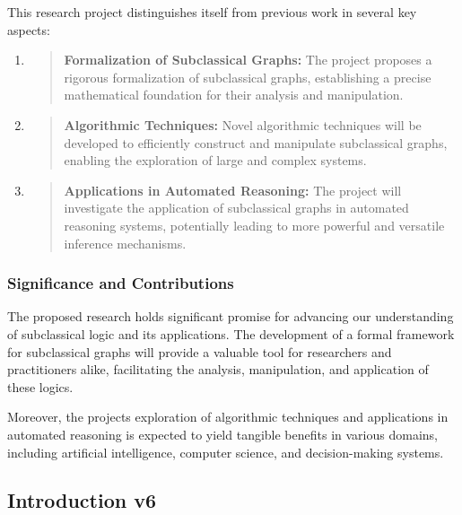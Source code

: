 This research project distinguishes itself from previous work in several
key aspects:

\begin{enumerate}
\def\labelenumi{\arabic{enumi}.}
\item
  \begin{quote}
  \textbf{Formalization of Subclassical Graphs:} The project proposes a
  rigorous formalization of subclassical graphs, establishing a precise
  mathematical foundation for their analysis and manipulation.
  \end{quote}
\item
  \begin{quote}
  \textbf{Algorithmic Techniques:} Novel algorithmic techniques will be
  developed to efficiently construct and manipulate subclassical graphs,
  enabling the exploration of large and complex systems.
  \end{quote}
\item
  \begin{quote}
  \textbf{Applications in Automated Reasoning:} The project will
  investigate the application of subclassical graphs in automated
  reasoning systems, potentially leading to more powerful and versatile
  inference mechanisms.
  \end{quote}
\end{enumerate}

\hypertarget{significance-and-contributions}{%
\subsubsection{Significance and
Contributions}\label{significance-and-contributions}}

The proposed research holds significant promise for advancing our
understanding of subclassical logic and its applications. The
development of a formal framework for subclassical graphs will provide a
valuable tool for researchers and practitioners alike, facilitating the
analysis, manipulation, and application of these logics.

Moreover, the project\textquotesingle s exploration of algorithmic
techniques and applications in automated reasoning is expected to yield
tangible benefits in various domains, including artificial intelligence,
computer science, and decision-making systems.

\hypertarget{introduction-v6}{%
\subsection{Introduction v6}\label{introduction-v6}}

